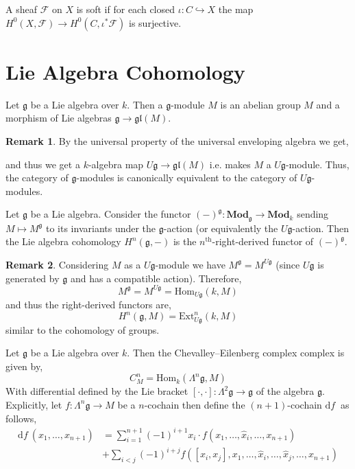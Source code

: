 \documentclass[12pt]{extarticle}
\newcommand{\Hom}[3]{\mathrm{Hom}_{#1}\left( #2, #3 \right)}
\renewcommand{\d}[1]{ \mathrm{d}#1 \:}
\theoremstyle{definition}
\newtheorem{remark}{Remark}
\newenvironment{definition}[1][Definition:]{\begin{trivlist}
\item[\hskip \labelsep {\bfseries #1}]}{\end{trivlist}}
\newcommand{\Ext}[4]{\mathrm{Ext}^{#1}_{#2} \left( #3, #4 \right)}
\newcommand{\F}{\mathcal{F}}
\newcommand{\g}{\mathfrak{g}}
\newcommand{\gl}[1]{\mathfrak{gl}\left(#1\right)}
\newcommand{\embed}{\hookrightarrow}
\begin{document}
\begin{definition}
A sheaf $\F$ on $X$ is soft if for each closed $\iota : C \embed X$ the map $H^0(X, \F) \to H^0(C, \iota^* \F)$ is surjective. 
\end{definition}

\section{Lie Algebra Cohomology}

\begin{definition}
Let $\g$ be a Lie algebra over $k$. Then a $\g$-module $M$ is an abelian group $M$ and a morphism of Lie algebras $\g \to \gl{M}$. 
\end{definition}

\begin{remark}
By the universal property of the universal enveloping algebra we get,
\begin{center}
\end{center}
and thus we get a $k$-algebra map $U \g \to \gl{M}$ i.e. makes $M$ a $U \g$-module. Thus, the category of $\g$-modules is canonically equivalent to the category of $U \g$-modules. 
\end{remark}

\begin{definition}
Let $\g$ be a Lie algebra. Consider the functor $(-)^\g : \mathbf{Mod}_\g \to \mathbf{Mod}_k$ sending $M \mapsto M^\g$ to its invariants under the $\g$-action (or equivalently the $U \g$-action. Then the Lie algebra cohomology $H^n(\g, -)$ is the $n^{\text{th}}$-right-derived functor of $(-)^\g$.  
\end{definition}

\begin{remark}
Considering $M$ as a $U\g$-module we have $M^\g = M^{U \g}$ (since $U \g$ is generated by $\g$ and has a compatible action). Therefore,
\[ M^{\g} = M^{U \g} = \Hom{U \g}{k}{M} \]
and thus the right-derived functors are,
\[ H^n(\g, M) = \Ext{n}{U \g}{k}{M} \]
similar to the cohomology of groups.
\end{remark}


\begin{definition}
Let $\g$ be a Lie algebra over $k$. Then the Chevalley–Eilenberg complex complex is given by,
\[ C_M^n = \Hom{k}{\Lambda^n \g}{M} \]
With differential defined by the Lie bracket $[\cdot,\cdot] : \Lambda^2 \g \to \g$ of the algebra $\g$. Explicitly, let $f : \Lambda^n \g \to M$ be a $n$-cochain then define the $(n+1)$-cochain $\d{f}$ as follows,
\begin{align*}
\d{f}(x_1, \dots, x_{n+1}) & = \sum_{i = 1}^{n+1} (-1)^{i + 1} x_i \cdot f(x_1, \dots, \hat{x}_i, \dots, x_{n+1}) 
\\
& + \sum_{i < j} (-1)^{i + j} f([x_i, x_j], x_1, \dots, \hat{x}_i, \dots, \hat{x}_j, \dots, x_{n+1})
\end{align*}
\end{definition}
\end{document}
